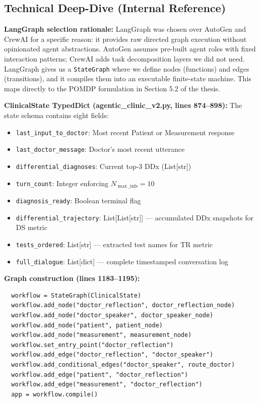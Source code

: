 \documentclass[12pt]{article}
\begin{document}
  \subsection*{Technical Deep-Dive (Internal Reference)}
  {\color{techgray}
  \textbf{LangGraph selection rationale:} LangGraph was chosen over AutoGen and CrewAI for a specific reason: it provides raw directed graph execution without opinionated agent abstractions. AutoGen assumes pre-built agent roles with fixed interaction patterns; CrewAI adds task decomposition layers we did not need. LangGraph gives us a \texttt{StateGraph} where we define nodes (functions) and edges (transitions), and it compiles them into an executable finite-state machine. This maps directly to the POMDP formulation in Section 5.2 of the thesis.

  \textbf{ClinicalState TypedDict (agentic\_clinic\_v2.py, lines 874--898):} The state schema contains eight fields:
  \begin{itemize}
    \item \texttt{last\_input\_to\_doctor}: Most recent Patient or Measurement response
    \item \texttt{last\_doctor\_message}: Doctor's most recent utterance
    \item \texttt{differential\_diagnoses}: Current top-3 DDx (List[str])
    \item \texttt{turn\_count}: Integer enforcing $N_{\max\_\text{infs}} = 10$
    \item \texttt{diagnosis\_ready}: Boolean terminal flag
    \item \texttt{differential\_trajectory}: List[List[str]] --- accumulated DDx snapshots for DS metric
    \item \texttt{tests\_ordered}: List[str] --- extracted test names for TR metric
    \item \texttt{full\_dialogue}: List[dict] --- complete timestamped conversation log
  \end{itemize}

  \textbf{Graph construction (lines 1183--1195):}
  \begin{verbatim}
  workflow = StateGraph(ClinicalState)
  workflow.add_node("doctor_reflection", doctor_reflection_node)
  workflow.add_node("doctor_speaker", doctor_speaker_node)
  workflow.add_node("patient", patient_node)
  workflow.add_node("measurement", measurement_node)
  workflow.set_entry_point("doctor_reflection")
  workflow.add_edge("doctor_reflection", "doctor_speaker")
  workflow.add_conditional_edges("doctor_speaker", route_doctor)
  workflow.add_edge("patient", "doctor_reflection")
  workflow.add_edge("measurement", "doctor_reflection")
  app = workflow.compile()
  \end{verbatim}

}
\end{document}
